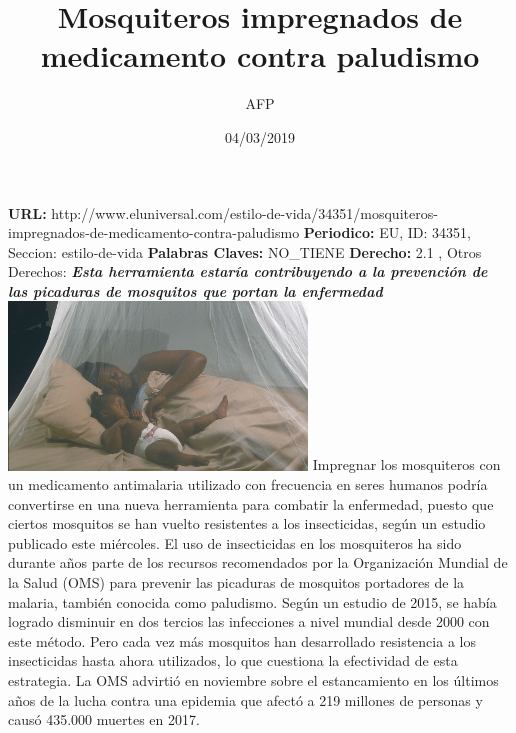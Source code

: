 \documentclass{article}%
\title{\textbf{Mosquiteros impregnados de medicamento contra paludismo}}%
\author{AFP}%
\date{04/03/2019}%
\begin{document}
%
\normalsize%
\maketitle%
\textbf{URL: }%
http://www.eluniversal.com/estilo{-}de{-}vida/34351/mosquiteros{-}impregnados{-}de{-}medicamento{-}contra{-}paludismo\newline%
%
\textbf{Periodico: }%
EU, %
ID: %
34351, %
Seccion: %
estilo{-}de{-}vida\newline%
%
\textbf{Palabras Claves: }%
NO\_TIENE\newline%
%
\textbf{Derecho: }%
2.1%
, Otros Derechos: %
\newline%
%
\textbf{\textit{Esta herramienta estaría contribuyendo a la prevención de las picaduras de mosquitos que portan la enfermedad}}%
\newline%
\newline%
%
\includegraphics[width=300px]{EU_34351.jpg}%
\newline%
%
Impregnar los mosquiteros con un medicamento antimalaria utilizado con frecuencia en seres humanos podría convertirse en una nueva herramienta para combatir la enfermedad, puesto que ciertos mosquitos se han vuelto resistentes a los insecticidas, según un estudio publicado este miércoles.%
\newline%
%
El uso de insecticidas en los mosquiteros ha sido durante años parte de los recursos recomendados por la Organización Mundial de la Salud (OMS) para prevenir las picaduras de mosquitos portadores de la malaria, también conocida como paludismo.%
\newline%
%
Según un estudio de 2015, se había logrado disminuir en dos tercios las infecciones a nivel mundial desde 2000 con este método.  \newline%
\newline%
Pero cada vez más mosquitos han desarrollado resistencia a los insecticidas hasta ahora utilizados, lo que cuestiona la efectividad de esta estrategia.%
\newline%
%
La OMS advirtió en noviembre sobre el estancamiento en los últimos años de la lucha contra una epidemia que afectó a 219 millones de personas y causó 435.000 muertes en 2017.%
\end{document}
